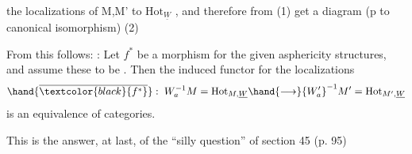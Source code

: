 
the localizations of M,M' to $\mathrm{Hot}_{\underline{W}}$ , and therefore from (1) get a
\hand{\uline{\textcolor{black}{commutative}}} diagram (p to canonical isomorphism)
(2)

From this follows:
\hand{\uline{\textcolor{black}{Corollary}}}: Let $f^{*}$ be a morphism for the given asphericity structures,
and assume these to be \hand{\uline{\textcolor{black}{modelizing}}} . Then the induced functor for the
localizations
\[ \hand{\overline{\textcolor{black}{f^{*}}}} : \; W_{a}^{-1}M = \mathrm{Hot}_{M,\underline{W}} \hand{\longrightarrow} {W'_{a}}^{-1}M' = \mathrm{Hot}_{M',\underline{W}} \]
is an equivalence of categories.

This is the answer, at last, of the ``silly question'' of section
45 (p. 95)\hand{!}

